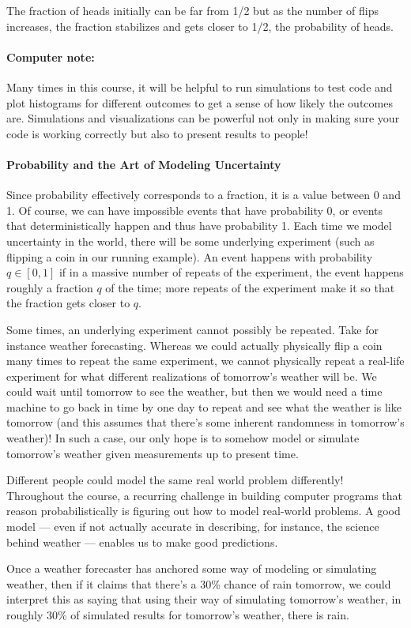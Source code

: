 \documentclass[6008notes.tex]{subfiles}
\begin{document}
The fraction of heads initially can be far from 1/2 but as the number of flips increases, the fraction stabilizes and gets closer to 1/2, the probability of heads.

\paragraph{Computer note:} Many times in this course, it will be helpful to run simulations to test code and plot histograms for different outcomes to get a sense of how likely the outcomes are. Simulations and visualizations can be powerful not only in making sure your code is working correctly but also to present results to people!

\paragraph{Probability and the Art of Modeling Uncertainty}
Since probability effectively corresponds to a fraction, it is a value between 0 and 1. Of course, we can have impossible events that have probability 0, or events that deterministically happen and thus have probability 1. Each time we model uncertainty in the world, there will be some underlying experiment (such as flipping a coin in our running example). An event happens with probability $q \in [0,1]$ if in a massive number of repeats of the experiment, the event happens roughly a fraction $q$ of the time; more repeats of the experiment make it so that the fraction gets closer to $q$.

Some times, an underlying experiment cannot possibly be repeated. Take for instance weather forecasting. Whereas we could actually physically flip a coin many times to repeat the same experiment, we cannot physically repeat a real-life experiment for what different realizations of tomorrow's weather will be. We could wait until tomorrow to see the weather, but then we would need a time machine to go back in time by one day to repeat and see what the weather is like tomorrow (and this assumes that there's some inherent randomness in tomorrow's weather)! In such a case, our only hope is to somehow model or simulate tomorrow's weather given measurements up to present time.

Different people could model the same real world problem differently! Throughout the course, a recurring challenge in building computer programs that reason probabilistically is figuring out how to model real-world problems. A good model --- even if not actually accurate in describing, for instance, the science behind weather --- enables us to make good predictions.

Once a weather forecaster has anchored some way of modeling or simulating weather, then if it claims that there's a 30\% chance of rain tomorrow, we could interpret this as saying that using their way of simulating tomorrow's weather, in roughly 30\% of simulated results for tomorrow's weather, there is rain.
\end{document}
